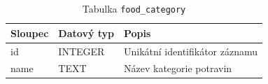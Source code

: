 \begin{table}[ht!]
    \centering
    \begin{tabularx}{\textwidth}{|l|l|L|}
        \hline
        \textbf{Sloupec} & \textbf{Datový typ} & \textbf{Popis}                 \\ \hline
        id               & INTEGER             & Unikátní identifikátor záznamu \\ \hline
        name             & TEXT                & Název kategorie potravin       \\ \hline
    \end{tabularx}
    \caption{Tabulka \texttt{food\_category}}
    \label{tab:food_category}
\end{table}
